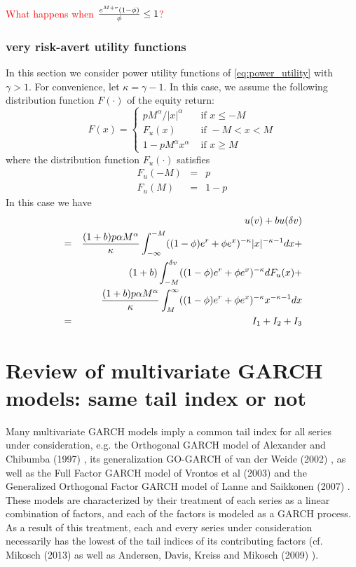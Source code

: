 \documentclass{article}
\begin{document}
\textcolor{red}{
  What happens when ${e^{M + r} (1 - \phi) \over \phi} \leq 1$?
}

\subsubsection{very risk-avert utility functions}
In this section we consider power utility functions of
\eqref{eq:power_utility} with $\gamma > 1$. For convenience,
let $\kappa = \gamma - 1$. In this case, we assume the following
distribution function $F(\cdot)$ of the equity return:
\[
F(x) = \left\{
\begin{array}{ll}
    p M^\alpha / |x|^\alpha & \text{ if } x \leq -M \\
    F_u(x) & \text{ if } -M < x < M\\
    1 - p M^\alpha x^\alpha & \text{ if } x \geq M
\end{array}
\right.
\]
where the distribution function $F_u(\cdot)$ satisfies
\begin{eqnarray*}
  F_u(-M) &=& p \\
  F_u(M) &=& 1 - p
\end{eqnarray*}
In this case we have
\begin{eqnarray*}
  && u(v) + b u(\delta v) \\
  &=&
  {
    (1 + b) p \alpha M^\alpha
    \over
    \kappa
  }
  \int_{-\infty}^{-M}
  ((1 - \phi) e^r + \phi e^x)^{-\kappa} |x|^{-\kappa - 1}
  dx + \\
  &&
  (1 + b) \int_{-M}^{\delta v}
  ((1 - \phi) e^r + \phi e^x)^{-\kappa} d F_u(x) + \\
  &&
  {
    (1 + b) p \alpha M^\alpha
    \over
    \kappa
  }
  \int_{M}^{\infty}
  ((1 - \phi) e^r + \phi e^x)^{-\kappa} x^{-\kappa - 1}
  dx \\
  &=&
  I_1 + I_2 + I_3
\end{eqnarray*}



\section{Review of multivariate GARCH models: same tail index or not}
Many multivariate GARCH models imply a common tail index for all
series under consideration, e.g. the Orthogonal GARCH model of
Alexander and Chibumba (1997) \cite{alexander1997multivariate}, its
generalization GO-GARCH of van der Weide (2002) \cite{van2002go}, as
well as the Full Factor GARCH model of Vrontos et al (2003)
\cite{vrontos2003full} and the Generalized Orthogonal Factor GARCH
model of Lanne and Saikkonen (2007) \cite{lanne2007modeling}. These
models are characterized by their treatment of each series as a linear
combination of factors, and each of the factors is modeled as a GARCH
process. As a result of this treatment, each and every series under
consideration necessarily has the lowest of the tail indices of its
contributing factors (cf. Mikosch (2013) \cite{Mikosch2013} as well
as Andersen, Davis, Kreiss and Mikosch (2009)
\cite{andersen2009handbook}).
\end{document}
